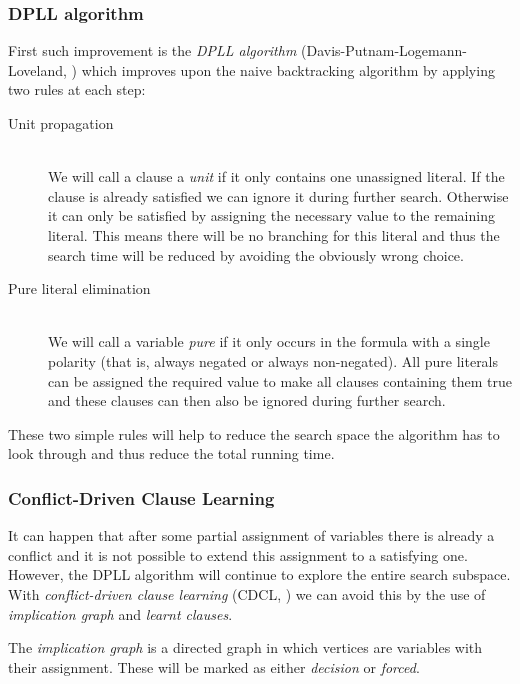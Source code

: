\subsubsection{DPLL algorithm}
First such improvement is the \emph{DPLL algorithm} (Davis-Putnam-Logemann-Loveland, \citep{davis1960computing,davis1962machine}) which improves upon the naive backtracking algorithm by applying two rules at each step:

\begin{description}
\item[Unit propagation] \hfill \\
We will call a clause a \emph{unit} if it only contains one unassigned literal.
If the clause is already satisfied we can ignore it during further search.
Otherwise it can only be satisfied by assigning the necessary value to the remaining literal.
This means there will be no branching for this literal and thus the search time will be reduced by avoiding the obviously wrong choice.

\item[Pure literal elimination] \hfill \\
We will call a variable \emph{pure} if it only occurs in the formula with a single polarity (that is, always negated or always non-negated).
All pure literals can be assigned the required value to make all clauses containing them true and these clauses can then also be ignored during further search.
\end{description}

These two simple rules will help to reduce the search space the algorithm has to look through and thus reduce the total running time.

\subsubsection{Conflict-Driven Clause Learning}
It can happen that after some partial assignment of variables there is already a conflict and it is not possible to extend this assignment to a satisfying one.
However, the DPLL algorithm will continue to explore the entire search subspace.
With \emph{conflict-driven clause learning} (CDCL, \citep{bayardo1997using,marques1999grasp}) we can avoid this by the use of \emph{implication graph} and \emph{learnt clauses}.

The \emph{implication graph} is a directed graph in which vertices are variables with their assignment.
These will be marked as either \emph{decision} or \emph{forced}.

